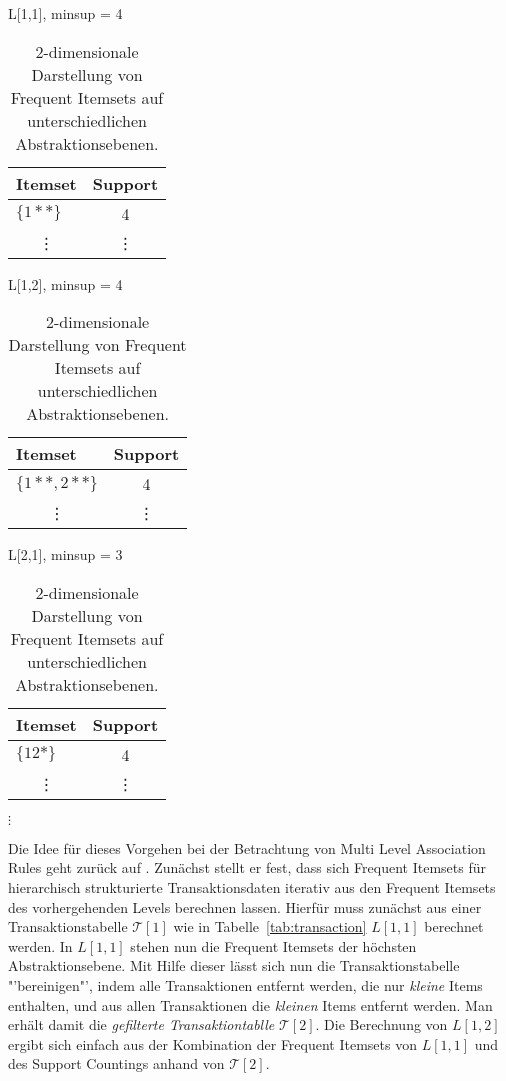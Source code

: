 \begin{table}[tbh]
	\caption{2-dimensionale Darstellung von Frequent Itemsets auf 
	unterschiedlichen Abstraktionsebenen.}
	\label{tab:3}
	\parbox{.4\linewidth}{
		\centering
		L[1,1], minsup = 4
		\begin{tabular}{lc}
			\toprule
			\textbf{Itemset}& \textbf{Support}\\
			\midrule
			\(\{1**\}\)	& 4\\
			\multicolumn{1}{c}{\vdots}& \vdots\\
			\bottomrule
		\end{tabular}
	}
	\hfill
	\parbox{.4\linewidth}{
		\centering
		L[1,2], minsup = 4
		\begin{tabular}{lc}
			\toprule
			\textbf{Itemset}& \textbf{Support}\\
			\midrule
			\(\{1**, 2**\}\)& 4\\
			\multicolumn{1}{c}{\vdots}& \vdots\\
			\bottomrule
		\end{tabular}
	}

	\vskip 15pt

	\parbox{.4\linewidth}{
		\centering
		L[2,1], minsup = 3
		\begin{tabular}{lc}
			\toprule
			\textbf{Itemset}& \textbf{Support}\\
			\midrule
			\(\{12*\}\)& 4\\
			\multicolumn{1}{c}{\vdots}& \vdots\\
			\bottomrule
		\end{tabular}
	}
	\hfill
	\parbox{.4\linewidth}{
		\centering
		\(\vdots\)
	}
\end{table}

Die Idee für dieses Vorgehen bei der Betrachtung von Multi Level Association Rules
geht zurück auf \citet{Han95}. Zunächst stellt er fest, dass sich Frequent Itemsets
für hierarchisch strukturierte Transaktionsdaten iterativ aus den Frequent Itemsets
des vorhergehenden Levels berechnen lassen. Hierfür muss zunächst aus einer 
Transaktionstabelle \(\mathcal{T}[1]\) wie in 
Tabelle~\ref{tab:transaction} \(L[1,1]\) berechnet werden.
In \(L[1,1]\) stehen nun die Frequent Itemsets der höchsten Abstraktionsebene. Mit
Hilfe dieser lässt sich nun die Transaktionstabelle "'bereinigen"', indem alle
Transaktionen entfernt werden, die nur \textit{kleine} Items enthalten, und aus
allen Transaktionen die \textit{kleinen} Items entfernt werden. Man erhält damit
die \textit{gefilterte Transaktiontablle} \(\mathcal{T}[2]\). Die Berechnung von
\(L[1,2]\) ergibt sich einfach aus der Kombination der Frequent Itemsets von 
\(L[1,1]\) und des Support Countings anhand von \(\mathcal{T}[2]\).

